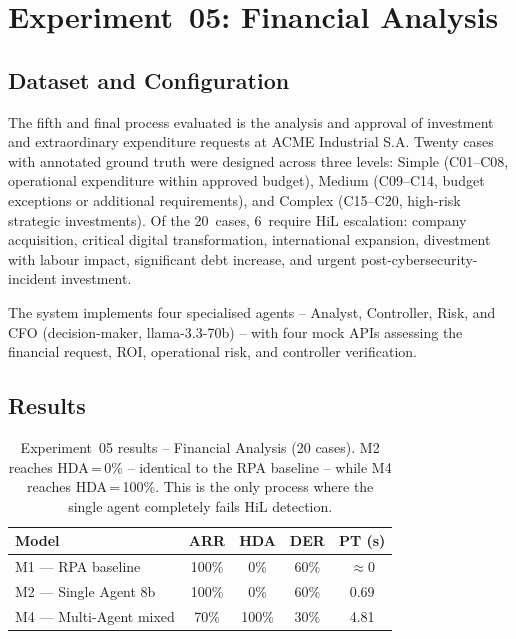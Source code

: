 \documentclass[preprint,12pt,authoryear]{elsarticle}
\begin{document}
\section{Experiment~05: Financial Analysis}
\label{sec:financial}

\subsection{Dataset and Configuration}

The fifth and final process evaluated is the analysis and approval of
investment and extraordinary expenditure requests at ACME Industrial S.A.
Twenty cases with annotated ground truth were designed across three levels:
Simple (C01--C08, operational expenditure within approved budget), Medium
(C09--C14, budget exceptions or additional requirements), and Complex
(C15--C20, high-risk strategic investments).
Of the 20~cases, 6~require HiL escalation: company acquisition, critical
digital transformation, international expansion, divestment with labour
impact, significant debt increase, and urgent post-cybersecurity-incident
investment.

The system implements four specialised agents -- Analyst, Controller, Risk,
and CFO (decision-maker, llama-3.3-70b) -- with four mock APIs assessing
the financial request, ROI, operational risk, and controller verification.

\subsection{Results}

\begin{table}[htbp]
\centering
\caption{Experiment~05 results -- Financial Analysis (20 cases).
         M2 reaches HDA\,=\,0\% -- identical to the RPA baseline -- while
         M4 reaches HDA\,=\,100\%. This is the only process where the single
         agent completely fails HiL detection.}
\label{tab:financial}
\begin{tabular}{lcccc}
\toprule
\textbf{Model} & \textbf{ARR} & \textbf{HDA} & \textbf{DER} & \textbf{PT (s)} \\
\midrule
M1 --- RPA baseline      & 100\% & 0\%   & 60\% & $\approx$0 \\
M2 --- Single Agent 8b   & 100\% & 0\%   & 60\% & 0.69 \\
M4 --- Multi-Agent mixed &  70\% & 100\% & 30\% & 4.81 \\
\bottomrule
\end{tabular}
\end{table}
\end{document}
